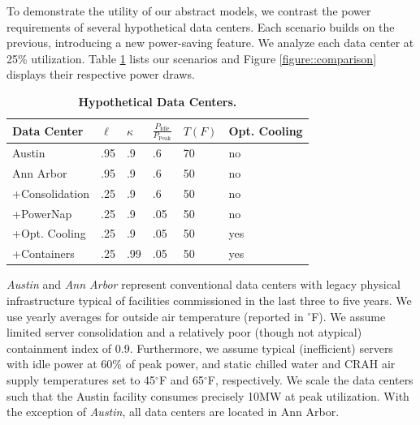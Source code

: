 To demonstrate the utility of our abstract models, we contrast the power requirements of several hypothetical data centers.  Each scenario builds on the previous, introducing a new power-saving feature. We analyze each data center at 25\% utilization.
Table \ref{table::MockDataCenters} lists our scenarios and Figure \ref{figure::comparison} displays their respective power draws.
\begin{table}[b]
\begin{center}
\caption{ \textbf{Hypothetical Data Centers.} }
\label{table::MockDataCenters}
\begin{tabular}{l l l l l l}
   \toprule
      Data Center & $\ell$ & $\kappa$ & $\frac{P_{\mathrm{Idle}}}{P_{\mathrm{Peak}}}$ & $T (F)$ & Opt. Cooling \\
    \midrule
      Austin & .95 & .9 & .6 & 70 & no \\
      Ann Arbor & .95 & .9 & .6 & 50 & no \\
      +Consolidation & .25 & .9 & .6 & 50 & no \\
      +PowerNap & .25 & .9 & .05 & 50 & no \\
      +Opt. Cooling & .25 & .9 & .05 & 50 & yes \\
      +Containers & .25 & .99 & .05 & 50 & yes \\
  \bottomrule
  \end{tabular}
\end{center}
\end{table}
\emph{Austin} and \emph{Ann Arbor} represent conventional data centers with legacy physical infrastructure typical of facilities commissioned in the last three to five years.  We use yearly averages for outside air temperature (reported in $^{\circ}$F).  We assume limited server consolidation and a relatively poor (though not atypical) containment index of 0.9. Furthermore, we assume typical (inefficient) servers with idle power at 60\% of peak power, and static chilled water and CRAH air supply temperatures set to 45$^{\circ}$F and 65$^{\circ}$F, respectively.  We scale the data centers such that the Austin facility consumes precisely 10MW at peak utilization. With the exception of \emph{Austin}, all data centers are located in Ann Arbor.

